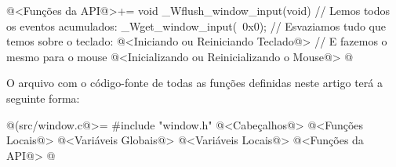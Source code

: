 \iniciocodigo
@<Funções da API@>+=
void _Wflush_window_input(void){
  // Lemos todos os eventos acumulados:
  _Wget_window_input(~0x0);
  // Esvaziamos tudo que temos sobre o teclado:
  @<Iniciando ou Reiniciando Teclado@>
  // E fazemos o mesmo para o mouse
  @<Inicializando ou Reinicializando o Mouse@>
}
@
\fimcodigo



O arquivo com o código-fonte de todas as funções definidas neste
artigo terá a seguinte forma:

\iniciocodigo
@(src/window.c@>=
#include "window.h"
@<Cabeçalhos@>
@<Funções Locais@>
@<Variáveis Globais@>
@<Variáveis Locais@>
@<Funções da API@>
@
\fimcodigo



\fim
